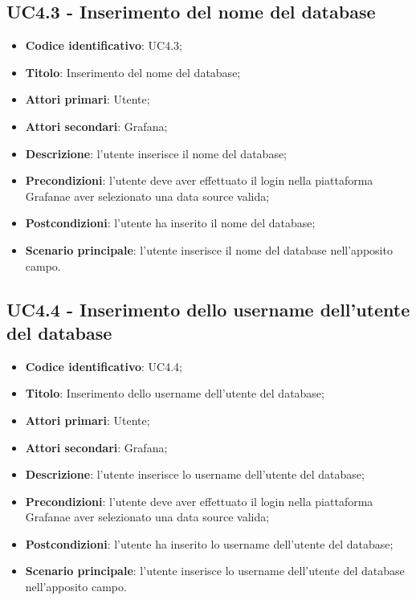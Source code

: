     \subsection{UC4.3 - Inserimento del nome del database}
        \begin{itemize}
            \item \textbf{Codice identificativo}: UC4.3;
            \item \textbf{Titolo}: Inserimento del nome del database;
            \item \textbf{Attori primari}: Utente;
            \item \textbf{Attori secondari}: Grafana\glo;
            \item \textbf{Descrizione}: l'utente inserisce il nome del database;
            \item \textbf{Precondizioni}: l'utente deve aver effettuato il login nella piattaforma Grafana\glo e aver selezionato una                                  data source valida;
            \item \textbf{Postcondizioni}: l'utente ha inserito il nome del database;
            \item \textbf{Scenario principale}: l'utente inserisce il nome del database nell'apposito campo.
        \end{itemize}
    \subsection{UC4.4 - Inserimento dello username dell'utente del database}
        \begin{itemize}
            \item \textbf{Codice identificativo}: UC4.4;
            \item \textbf{Titolo}: Inserimento dello username dell'utente del database;
            \item \textbf{Attori primari}: Utente;
            \item \textbf{Attori secondari}: Grafana\glo;
            \item \textbf{Descrizione}: l'utente inserisce lo username dell'utente del database;
            \item \textbf{Precondizioni}: l'utente deve aver effettuato il login nella piattaforma Grafana\glo e aver selezionato una                                  data source valida;
            \item \textbf{Postcondizioni}: l'utente ha inserito lo username dell'utente del database;
            \item \textbf{Scenario principale}: l'utente inserisce lo username dell'utente del database nell'apposito campo.
        \end{itemize}
